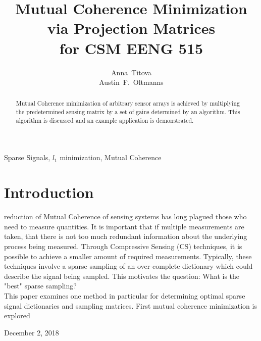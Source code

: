 \documentclass[journal]{IEEEtran}
\begin{document}
\title{Mutual Coherence Minimization \\via Projection Matrices\\ for CSM EENG 515}


\author{ 
Anna~Titova \\
Austin~F.~Oltmanns%
}

\maketitle


\begin{abstract}
Mutual Coherence minimization of arbitrary sensor arrays is achieved 
by multiplying the predetermined sensing matrix by a set of gains
determined by an algorithm. This algorithm is discussed and an example
application is demonstrated.
\end{abstract}
\begin{IEEEkeywords}
Sparse Signals, $l_1$ minimization, Mutual Coherence
\end{IEEEkeywords}

\section{Introduction}
 reduction of Mutual Coherence of sensing systems has long plagued
those who need to measure quantities. It is important that if multiple measurements
are taken, that there is not too much redundant information about the underlying 
process being measured. Through Compressive Sensing (CS) techniques, it is possible to achieve
a smaller amount of required measurements. Typically, these techniques involve a sparse
sampling of an over-complete dictionary which could describe the signal being sampled. This 
motivates the question: What is the "best" sparse sampling? \\
This paper examines one method in particular for determining optimal sparse signal 
dictionaries and sampling matrices. First mutual coherence minimization is explored

\hfill December 2, 2018
\end{document}
